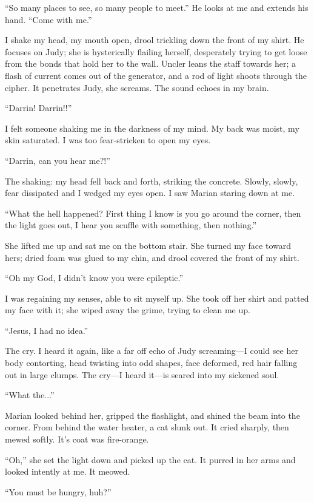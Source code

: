 ``So many places to see, so many people to meet.'' He looks at me and
extends his hand. ``Come with me.''

I shake my head, my mouth open, drool trickling down the front of my
shirt. He focuses on Judy; she is hysterically flailing herself,
desperately trying to get loose from the bonds that hold her to the
wall. Uncler leans the staff towards her; a flash of current comes out
of the generator, and a rod of light shoots through the cipher. It
penetrates Judy, she screams. The sound echoes in my brain.

``Darrin! Darrin!!''

I felt someone shaking me in the darkness of my mind. My back was moist,
my skin saturated. I was too fear-stricken to open my eyes.

``Darrin, can you hear me?!''

The shaking: my head fell back and forth, striking the concrete. Slowly,
slowly, fear dissipated and I wedged my eyes open. I saw Marian staring
down at me.

``What the hell happened? First thing I know is you go around the
corner, then the light goes out, I hear you scuffle with something, then
nothing.''

She lifted me up and sat me on the bottom stair. She turned my face
toward hers; dried foam was glued to my chin, and drool covered the
front of my shirt.

``Oh my God, I didn't know you were epileptic.''

I was regaining my senses, able to sit myself up. She took off her shirt
and patted my face with it; she wiped away the grime, trying to clean me
up.

``Jesus, I had no idea.''

The cry. I heard it again, like a far off echo of Judy screaming---I
could see her body contorting, head twisting into odd shapes, face
deformed, red hair falling out in large clumps. The cry---I heard
it---is seared into my sickened soul.

``What the...''

Marian looked behind her, gripped the flashlight, and shined the beam
into the corner. From behind the water heater, a cat slunk out. It cried
sharply, then mewed softly. It's coat was fire-orange.

``Oh,'' she set the light down and picked up the cat. It purred in her
arms and looked intently at me. It meowed.

``You must be hungry, huh?''

